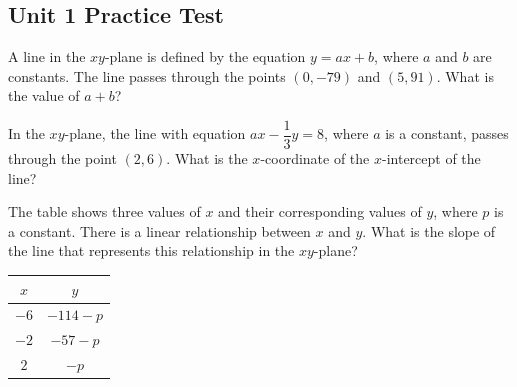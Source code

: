 \subsection*{Unit 1 Practice Test}

\setcounter{questionnum}{0}

\noindent\markforreview
\vspace{1em}

A line in the $xy$-plane is defined by the equation $y = ax + b$, where $a$ and $b$ are constants. The line passes through the points $(0, -79)$ and $(5, 91)$. What is the value of $a + b$?

\vspace{2em}

\noindent\markforreview
\vspace{1em}

In the $xy$-plane, the line with equation $ax - \dfrac{1}{3}y = 8$, where $a$ is a constant, passes through the point $(2, 6)$. What is the $x$-coordinate of the $x$-intercept of the line?

\vspace{2em}

\noindent\markforreview
\vspace{1em}

The table shows three values of $x$ and their corresponding values of $y$, where $p$ is a constant. There is a linear relationship between $x$ and $y$. What is the slope of the line that represents this relationship in the $xy$-plane?

\vspace{0.5em}

\begin{center}
\begin{tabular}{|c|c|}
\hline
$x$ & $y$ \\
\hline
$-6$ & $-114 - p$ \\
$-2$ & $-57 - p$ \\
$2$ & $-p$ \\
\hline
\end{tabular}
\end{center}

\vspace{0.75em}


\vspace{2em}

\noindent\markforreview
\vspace{1em}

